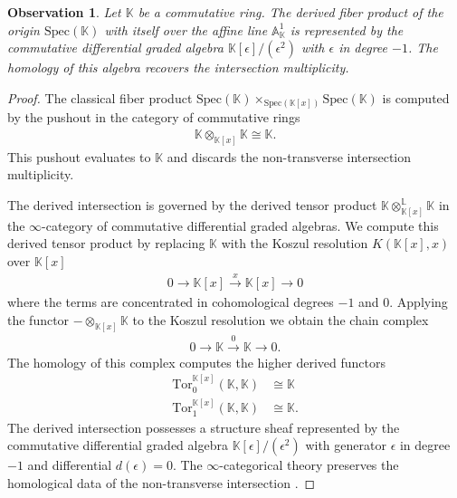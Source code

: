 \documentclass[reqno]{amsart}
\newtheorem{observation}[theorem]{Observation}
\theoremstyle{definition}
\theoremstyle{remark}
\begin{document}
\begin{observation}
  \label{prop:cdga_necessity}
  Let $\mathbb{K}$ be a commutative ring. The derived fiber product of the origin $\mathrm{Spec}(\mathbb{K})$ with itself over the affine line $\mathbb{A}^1_{\mathbb{K}}$ is represented by the commutative differential graded algebra $\mathbb{K}[\epsilon]/(\epsilon^2)$ with $\epsilon$ in degree $-1$. The homology of this algebra recovers the intersection multiplicity.
\end{observation}
\begin{proof}
  The classical fiber product $\mathrm{Spec}(\mathbb{K}) \times_{\mathrm{Spec}(\mathbb{K}[x])} \mathrm{Spec}(\mathbb{K})$ is computed by the pushout in the category of commutative rings
  \begin{align*}
    \mathbb{K} \otimes_{\mathbb{K}[x]} \mathbb{K} \cong \mathbb{K}.
  \end{align*}
  This pushout evaluates to $\mathbb{K}$ and discards the non-transverse intersection multiplicity.

  The derived intersection is governed by the derived tensor product $\mathbb{K} \otimes_{\mathbb{K}[x]}^{\mathbb{L}} \mathbb{K}$ in the $\infty$-category of commutative differential graded algebras. We compute this derived tensor product by replacing $\mathbb{K}$ with the Koszul resolution $K(\mathbb{K}[x], x)$ over $\mathbb{K}[x]$
  \begin{align*}
    0 \to \mathbb{K}[x] \xrightarrow{x} \mathbb{K}[x] \to 0
  \end{align*}
  where the terms are concentrated in cohomological degrees $-1$ and $0$. Applying the functor $- \otimes_{\mathbb{K}[x]} \mathbb{K}$ to the Koszul resolution we obtain the chain complex
  \begin{align*}
    0 \to \mathbb{K} \xrightarrow{0} \mathbb{K} \to 0.
  \end{align*}
  The homology of this complex computes the higher derived functors
  \begin{align*}
    \mathrm{Tor}_0^{\mathbb{K}[x]}(\mathbb{K}, \mathbb{K}) &\cong \mathbb{K} \\
    \mathrm{Tor}_1^{\mathbb{K}[x]}(\mathbb{K}, \mathbb{K}) &\cong \mathbb{K}.
  \end{align*}
  The derived intersection possesses a structure sheaf represented by the commutative differential graded algebra $\mathbb{K}[\epsilon]/(\epsilon^2)$ with generator $\epsilon$ in degree $-1$ and differential $d(\epsilon) = 0$. The $\infty$-categorical theory preserves the homological data of the non-transverse intersection \cite[Section 2]{ToenDAG}.
\end{proof}
\end{document}
